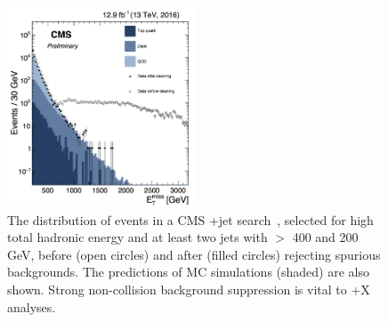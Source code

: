 \begin{figure}[!htpb]
\includegraphics[width=0.5\textwidth]{figures/FakeMETTemp.png}
\caption{The \MET distribution of events in a CMS \MET+jet search~\cite{CMS-PAS-JME-16-004}, selected for high total hadronic energy and at least two jets with \pt{} $>$ 400 and 200 GeV, before (open circles) and after (filled circles) rejecting spurious \MET backgrounds. The predictions of MC simulations (shaded) are also shown.
Strong non-collision background suppression is vital to \MET+X analyses.}
\label{fig:fakeMET}
\end{figure}

%

